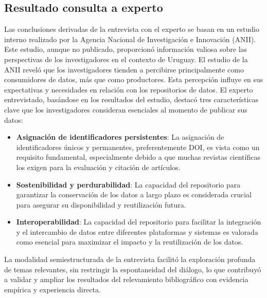 \documentclass[runningheads]{llncs}
\begin{document}
\subsection{Resultado consulta a experto}

Las conclusiones derivadas de la entrevista con el experto se basan en un estudio interno realizado por la Agencia Nacional de Investigación e Innovación (ANII). Este estudio, aunque no publicado, proporcionó información valiosa sobre las perspectivas de los investigadores en el contexto de Uruguay.
El estudio de la ANII reveló que los investigadores tienden a percibirse principalmente como consumidores de datos, más que como productores. Esta percepción influye en sus expectativas y necesidades en relación con los repositorios de datos.
El experto entrevistado, basándose en los resultados del estudio, destacó tres características clave que los investigadores consideran esenciales al momento de publicar sus datos:
\begin{itemize}
    \item \textbf{Asignación de identificadores persistentes}: La asignación de identificadores únicos y permanentes, preferentemente DOI, es vista como un requisito fundamental, especialmente debido a que muchas revistas científicas los exigen para la evaluación y citación de artículos.
    \item \textbf{Sostenibilidad y perdurabilidad}: La capacidad del repositorio para garantizar la conservación de los datos a largo plazo es considerada crucial para asegurar su disponibilidad y reutilización futura.
    \item \textbf{Interoperabilidad}: La capacidad del repositorio para facilitar la integración y el intercambio de datos entre diferentes plataformas y sistemas es valorada como esencial para maximizar el impacto y la reutilización de los datos.
\end{itemize}

La modalidad semiestructurada de la entrevista facilitó la exploración profunda de temas relevantes, sin restringir la espontaneidad del diálogo, lo que contribuyó a validar y ampliar los resultados del relevamiento bibliográfico con evidencia empírica y experiencia directa.
\end{document}

